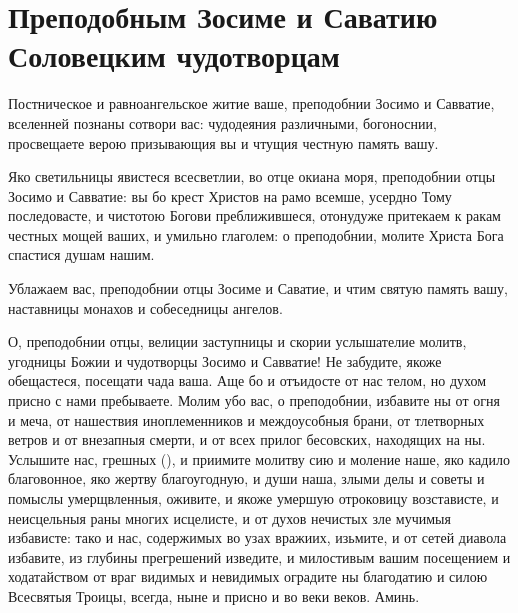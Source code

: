 \section{Преподобным Зосиме и Саватию Соловецким чудотворцам}\begin{mymulticols}
 


Постническое и равноангельское житие ваше, преподобнии Зосимо и Савватие, вселенней познаны сотвори вас: чудодеяния различными, богоноснии, просвещаете верою призывающия вы и чтущия честную память вашу.


Яко светильницы явистеся всесветлии, во отце окиана моря, преподобнии отцы Зосимо и Савватие: вы бо крест Христов на рамо всемше, усердно Тому последовасте, и чистотою Богови преближившеся, отонудуже притекаем к ракам честных мощей ваших, и умильно глаголем: о преподобнии, молите Христа Бога спастися душам нашим.


Ублажаем вас, преподобнии отцы Зосиме и Саватие, и чтим святую память вашу, наставницы монахов и собеседницы ангелов.


О, преподобнии отцы, велиции заступницы и скории услышателие молитв, угодницы Божии и чудотворцы Зосимо и Савватие! Не забудите, якоже обещастеся, посещати чада ваша. Аще бо и отъидосте от нас телом, но духом присно с нами пребываете. Молим убо вас, о преподобнии, избавите ны от огня и меча, от нашествия иноплеменников и междоусобныя брани, от тлетворных ветров и от внезапныя смерти, и от всех прилог бесовских, находящих на ны. Услышите нас, грешных (), и приимите молитву сию и моление наше, яко кадило благовонное, яко жертву благоугодную, и души наша, злыми делы и советы и помыслы умерщвленныя, оживите, и якоже умершую отроковицу возстависте, и неисцельныя раны многих исцелисте, и от духов нечистых зле мучимыя избависте: тако и нас, содержимых во узах вражиих, изьмите, и от сетей диавола избавите, из глубины прегрешений изведите, и милостивым вашим посещением и ходатайством от враг видимых и невидимых оградите ны благодатию и силою Всесвятыя Троицы, всегда, ныне и присно и во веки веков. Аминь.

\end{mymulticols}


